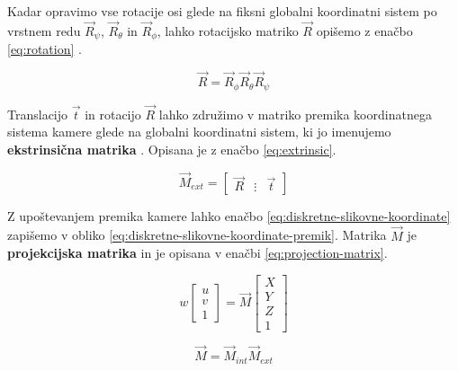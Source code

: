 Kadar opravimo vse rotacije osi glede na fiksni globalni koordinatni sistem po vrstnem redu $\vec{R}_\psi$, $\vec{R}_\theta$ in $\vec{R}_\phi$, lahko rotacijsko matriko $\vec{R}$ opišemo z enačbo \eqref{eq:rotation} \cite{bajd2011osnove}.


\begin{equation}
\vec{R} = \vec{R}_\phi \vec{R}_\theta \vec{R}_\psi
\label{eq:rotation}
\end{equation}


Translacijo $\vec{t}$ in rotacijo $\vec{R}$ lahko združimo v matriko premika koordinatnega sistema kamere glede na globalni koordinatni sistem, ki jo imenujemo \textbf{ekstrinsična matrika} \cite{trucco1998introductory}. Opisana je z enačbo \eqref{eq:extrinsic}.

\begin{equation}
\vec{M}_{ext} = \begin{bmatrix}
	\vec{R} & \vdots & \vec{t}
\end{bmatrix}
\label{eq:extrinsic}
\end{equation}


Z upoštevanjem premika kamere lahko enačbo \eqref{eq:diskretne-slikovne-koordinate} zapišemo v obliko \eqref{eq:diskretne-slikovne-koordinate-premik}. Matrika $\vec{M}$ je \textbf{projekcijska matrika} in je opisana v enačbi \eqref{eq:projection-matrix}.

\begin{equation}
w \begin{bmatrix}
	u \\ v \\ 1
	\end{bmatrix} = \vec{M}
    \begin{bmatrix}
    X \\ Y \\ Z \\ 1
    \end{bmatrix}
\label{eq:diskretne-slikovne-koordinate-premik}
\end{equation}


\begin{equation}
\vec{M} = \vec{M}_{int} \vec{M}_{ext}
\label{eq:projection-matrix}
\end{equation}
